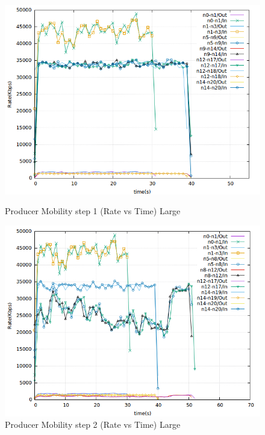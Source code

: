 \begin{figure}[H]

\begin{center}

\includegraphics[scale = 0.4]{Figures/step1.png}

\caption{Producer Mobility step 1 (Rate vs Time) Large} \label{step1} 


\includegraphics[scale = 0.4]{Figures/step2.png}

\caption{Producer Mobility step 2 (Rate vs Time) Large} \label{step2} 


\end{center}

\end{figure}



